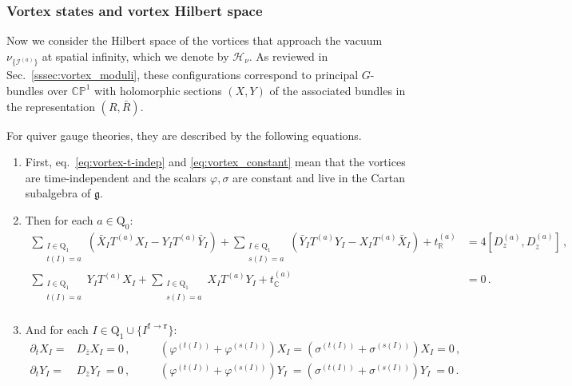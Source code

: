 \documentclass[12pt,a4paper]{article}
\renewcommand{\(}{\left(}
\renewcommand{\)}{\right)}
\renewcommand{\(}{\left(}
\renewcommand{\)}{\right)}
\begin{document}
\subsubsection{Vortex states and vortex Hilbert space}\label{sssec:vortex_Hilbert_space}

Now we consider the Hilbert space of the vortices that approach the vacuum $\nu_{\{\mathcal{I}^{(a)}\}}$ at spatial infinity, which we denote by $\mathcal{H}_\nu$.
As reviewed in Sec.~\ref{sssec:vortex_moduli}, these configurations correspond to principal $G$-bundles over $\mathbb{CP}^1$ with holomorphic sections $(X,Y)$ of the associated bundles in the representation $(R,\bar{R})$. 


For quiver gauge theories, they are described by the following equations.
\begin{enumerate}
\item First, eq.~\eqref{eq:vortex-t-indep} and \eqref{eq:vortex_constant} mean that the vortices are time-independent and the scalars $\varphi,\sigma$ are constant and live in the Cartan subalgebra of $\mathfrak{g}$.

\item Then for each $a\in \text{Q}_0$:
\begin{equation}\label{eq:vortex_eq_quiver_a}
\begin{aligned}
\sum_{\substack{I\in\textrm{Q}_1 \\ t(I)=a}}
(\bar{X}_I T^{(a)}X_I-Y_I T^{(a)}\bar{Y}_I)+\sum_{\substack{I\in\textrm{Q}_1 \\ s(I)=a}}(\bar{Y}_I T^{(a)}Y_I-X_{I}T^{(a)}\bar{X}_I)+t_{\mathbb{R}}^{(a)}&=4[D^{(a)}_z,D^{(a)}_{\bar{z}}]\,,\\
\sum_{\substack{I\in\textrm{Q}_1 \\ t(I)=a}}
Y_I T^{(a)}X_I+\sum_{\substack{I\in\textrm{Q}_1 \\ s(I)=a}}X_I T^{(a)}Y_I+t_{\mathbb{C}}^{(a)}&=0\,.\\
\end{aligned}
\end{equation}

\item And for each $I\in\text{Q}_1\cup\{I^{\mathtt{f}\to\mathtt{r}}\}$:
\begin{equation}\label{eq:vortex_eq_quiver_I}
\begin{aligned}
\partial_t X_I= &D_{\bar{z}}X_I=0\,,\quad &&(\varphi^{(t(I))}+\varphi^{(s(I))})X_I=(\sigma^{(t(I))}+\sigma^{(s(I))})X_I=0\,,\\
\partial_t Y_I= &D_{\bar{z}}Y_I\ =0\,,\quad &&(\varphi^{(t(I))}+\varphi^{(s(I))})Y_I\ =(\sigma^{(t(I))}+\sigma^{(s(I))})Y_I\ =0\,.\\
\end{aligned}
\end{equation}


\end{enumerate}
\end{document}
